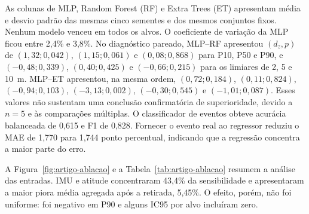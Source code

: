 \documentclass[article,a4paper,12pt,brazil,sumario=tradicional]{abntex2}
\begin{document}
\begin{table}[htb]
\centering
\caption{MAE no teste: estabilidade da MLP e referências.}
\label{tab:artigo-modelos}
\end{table}

As colunas de MLP, Random Forest (RF) e Extra Trees (ET) apresentam média e desvio padrão das mesmas cinco sementes e dos mesmos conjuntos fixos. Nenhum modelo venceu em todos os alvos. O coeficiente de variação da MLP ficou entre 2,4\% e 3,8\%. No diagnóstico pareado, MLP--RF apresentou $(d_z,p)$ de $(1,32;0,042)$, $(1,15;0,061)$ e $(0,08;0,868)$ para P10, P50 e P90, e $(-0,48;0,339)$, $(0,40;0,425)$ e $(-0,66;0,215)$ para os limiares de 2, 5 e 10~m. MLP--ET apresentou, na mesma ordem, $(0,72;0,184)$, $(0,11;0,824)$, $(-0,94;0,103)$, $(-3,13;0,002)$, $(-0,30;0,545)$ e $(-1,01;0,087)$. Esses valores não sustentam uma conclusão confirmatória de superioridade, devido a $n=5$ e às comparações múltiplas. O classificador de eventos obteve acurácia balanceada de 0,615 e F1 de 0,828. Fornecer o evento real ao regressor reduziu o MAE de 1,770 para 1,744 ponto percentual, indicando que a regressão concentra a maior parte do erro.

A Figura~\ref{fig:artigo-ablacao} e a Tabela~\ref{tab:artigo-ablacao} resumem a análise das entradas. IMU e atitude concentraram 43,4\% da sensibilidade e apresentaram a maior piora média agregada após a retirada, 5,45\%. O efeito, porém, não foi uniforme: foi negativo em P90 e alguns IC95 por alvo incluíram zero.
\end{document}
